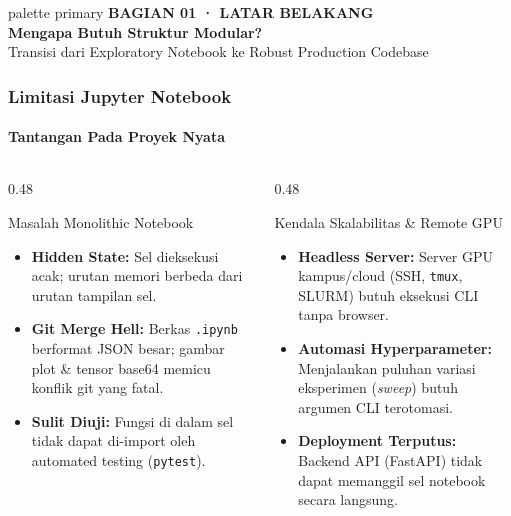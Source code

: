 \documentclass[t,aspectratio=169,xcolor=dvipsnames]{beamer}
\begin{document}
\begin{frame}[plain]
  \begin{beamercolorbox}[wd=\paperwidth,ht=0.96\paperheight,sep=0.8cm]{palette primary}
    \vspace{1.2cm}
    {\scriptsize\bfseries\color{dlMute}BAGIAN 01 · LATAR BELAKANG}\\[0.4cm]
    {\Huge\bfseries Mengapa Butuh Struktur Modular?}\\[0.4cm]
    {\small\color{dlHairline}Transisi dari Exploratory Notebook ke Robust Production Codebase}
    \vfill
  \end{beamercolorbox}
\end{frame}

\begin{frame}
  \frametitle{Limitasi Jupyter Notebook}
  \framesubtitle{Tantangan Pada Proyek Nyata}

  \begin{columns}[t]
    \begin{column}{0.48\textwidth}
      \begin{alertblock}{Masalah Monolithic Notebook}
        \small
        \begin{itemize}\setlength{\itemsep}{2pt}
          \item \textbf{Hidden State:} Sel dieksekusi acak; urutan memori berbeda dari urutan tampilan sel.
          \item \textbf{Git Merge Hell:} Berkas \texttt{.ipynb} berformat JSON besar; gambar plot \& tensor base64 memicu konflik git yang fatal.
          \item \textbf{Sulit Diuji:} Fungsi di dalam sel tidak dapat di-import oleh automated testing (\texttt{pytest}).
        \end{itemize}
      \end{alertblock}
    \end{column}

    \begin{column}{0.48\textwidth}
      \begin{block}{Kendala Skalabilitas \& Remote GPU}
        \small
        \begin{itemize}\setlength{\itemsep}{2pt}
          \item \textbf{Headless Server:} Server GPU kampus/cloud (SSH, \texttt{tmux}, SLURM) butuh eksekusi CLI tanpa browser.
          \item \textbf{Automasi Hyperparameter:} Menjalankan puluhan variasi eksperimen (\textit{sweep}) butuh argumen CLI terotomasi.
          \item \textbf{Deployment Terputus:} Backend API (FastAPI) tidak dapat memanggil sel notebook secara langsung.
        \end{itemize}
      \end{block}
    \end{column}
  \end{columns}
\end{frame}
\end{document}
